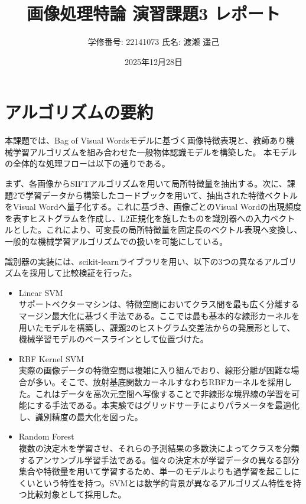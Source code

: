 \documentclass[a4paper,11pt]{jsarticle}
\title{画像処理特論 演習課題3 レポート}
\author{学修番号: 22141073 \quad 氏名: 渡瀬 遥己}
\date{2025年12月28日}
\begin{document}
\maketitle

\section{アルゴリズムの要約}

本課題では、Bag of Visual Wordsモデルに基づく画像特徴表現と、教師あり機械学習アルゴリズムを組み合わせた一般物体認識モデルを構築した。
本モデルの全体的な処理フローは以下の通りである。

まず、各画像からSIFTアルゴリズムを用いて局所特徴量を抽出する。次に、課題2で学習データから構築したコードブックを用いて、抽出された特徴ベクトルをVisual Wordへ量子化する。これに基づき、画像ごとのVisual Wordの出現頻度を表すヒストグラムを作成し、L2正規化を施したものを識別器への入力ベクトルとした。これにより、可変長の局所特徴量を固定長のベクトル表現へ変換し、一般的な機械学習アルゴリズムでの扱いを可能にしている。

識別器の実装には、scikit-learnライブラリを用い、以下の3つの異なるアルゴリズムを採用して比較検証を行った。

\begin{itemize}
    \item Linear SVM\\
    サポートベクターマシンは、特徴空間においてクラス間を最も広く分離するマージン最大化に基づく手法である。ここでは最も基本的な線形カーネルを用いたモデルを構築し、課題2のヒストグラム交差法からの発展形として、機械学習モデルのベースラインとして位置づけた。
    
    \item RBF Kernel SVM\\
    実際の画像データの特徴空間は複雑に入り組んでおり、線形分離が困難な場合が多い。そこで、放射基底関数カーネルすなわちRBFカーネルを採用した。これはデータを高次元空間へ写像することで非線形な境界線の学習を可能にする手法である。本実験ではグリッドサーチによりパラメータを最適化し、識別精度の最大化を図った。
    
    \item Random Forest\\
    複数の決定木を学習させ、それらの予測結果の多数決によってクラスを分類するアンサンブル学習手法である。個々の決定木が学習データの異なる部分集合や特徴量を用いて学習するため、単一のモデルよりも過学習を起こしにくいという特性を持つ。SVMとは数学的背景が異なるアルゴリズム特性を持つ比較対象として採用した。
\end{itemize}
\end{document}

